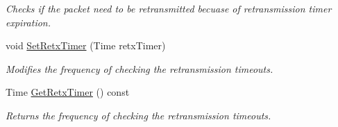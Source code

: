 \begin{DoxyCompactItemize}
\begin{DoxyCompactList}\small\item\em Checks if the packet need to be retransmitted becuase of retransmission timer expiration. \end{DoxyCompactList}\item 
void \hyperlink{classns3_1_1ndn_1_1Consumer_a94455b1375651162ac0898a8625af94e}{Set\+Retx\+Timer} (Time retx\+Timer)
\begin{DoxyCompactList}\small\item\em Modifies the frequency of checking the retransmission timeouts. \end{DoxyCompactList}\item 
Time \hyperlink{classns3_1_1ndn_1_1Consumer_a6371cca5c74aeed596e7627596ba2ab9}{Get\+Retx\+Timer} () const
\begin{DoxyCompactList}\small\item\em Returns the frequency of checking the retransmission timeouts. \end{DoxyCompactList}\end{DoxyCompactItemize}
